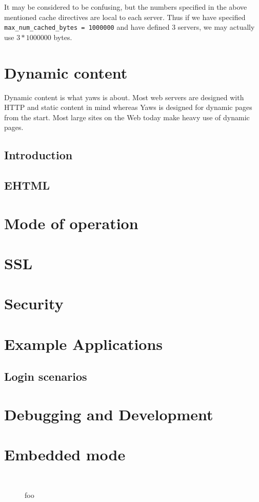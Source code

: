 \documentclass[11pt,oneside,english]{book}
\begin{document}
It may be considered to be confusing, but the numbers specified 
in the above mentioned cache directives are local to each
server. Thus if we have specified \verb+max_num_cached_bytes = 1000000+
and have defined 3 servers, we may actually use $3 * 1000000$ bytes.




\chapter{Dynamic content}

Dynamic content is what yaws is about. Most web servers are designed
with HTTP and static content in mind whereas Yaws is designed 
for dynamic pages from the start.
Most large sites on the Web today make heavy use of dynamic pages.


\section{Introduction}
\section{EHTML}


\chapter{Mode of operation}


\chapter{SSL}

\chapter{Security}

\chapter{Example Applications}

\section{Login scenarios}


\chapter{Debugging and Development}


\chapter {Embedded mode}




\begin{figure}[h]
\begin{verbatim}


\end{verbatim}
\caption{foo}
\end{figure}
\end{document}
